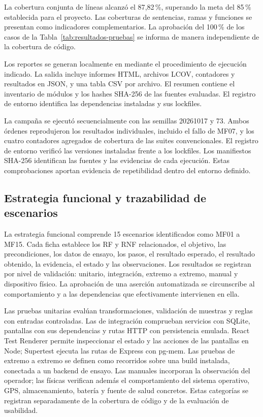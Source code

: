 La cobertura conjunta de líneas alcanzó el 87{,}82\,\%, superando la meta del 85\,\% establecida para el proyecto. Las coberturas de sentencias, ramas y funciones se presentan como indicadores complementarios. La aprobación del 100\,\% de los casos de la Tabla~\ref{tab:resultados-pruebas} se informa de manera independiente de la cobertura de código.

Los reportes se generan localmente en  mediante el procedimiento de ejecución indicado. La salida incluye informes HTML, archivos LCOV, contadores y resultados en JSON, y una tabla CSV por archivo. El resumen contiene el inventario de módulos y los hashes SHA-256 de las fuentes evaluadas. El registro de entorno identifica las dependencias instaladas y sus lockfiles.

La campaña se ejecutó secuencialmente con las semillas 20261017 y 73. Ambos órdenes reprodujeron los resultados individuales, incluido el fallo de MF07, y los cuatro contadores agregados de cobertura de las suites convencionales. El registro de entorno verificó las versiones instaladas frente a los lockfiles. Los manifiestos SHA-256 identifican las fuentes y las evidencias de cada ejecución. Estas comprobaciones aportan evidencia de repetibilidad dentro del entorno definido.

\subsection{Estrategia funcional y trazabilidad de escenarios}

La estrategia funcional comprende 15 escenarios identificados como MF01 a MF15. Cada ficha establece los RF y RNF relacionados, el objetivo, las precondiciones, los datos de ensayo, los pasos, el resultado esperado, el resultado obtenido, la evidencia, el estado y las observaciones. Los resultados se registran por nivel de validación: unitario, integración, extremo a extremo, manual y dispositivo físico. La aprobación de una aserción automatizada se circunscribe al comportamiento y a las dependencias que efectivamente intervienen en ella.

Las pruebas unitarias evalúan transformaciones, validación de muestras y reglas con entradas controladas. Las de integración comprueban servicios con SQLite, pantallas con sus dependencias y rutas HTTP con persistencia emulada. React Test Renderer permite inspeccionar el estado y las acciones de las pantallas en Node; Supertest ejecuta las rutas de Express con pg-mem. Las pruebas de extremo a extremo se definen como recorridos sobre una build instalada, conectada a un backend de ensayo. Las manuales incorporan la observación del operador; las físicas verifican además el comportamiento del sistema operativo, GPS, almacenamiento, batería y fuente de salud concretos. Estas categorías se registran separadamente de la cobertura de código y de la evaluación de usabilidad.

